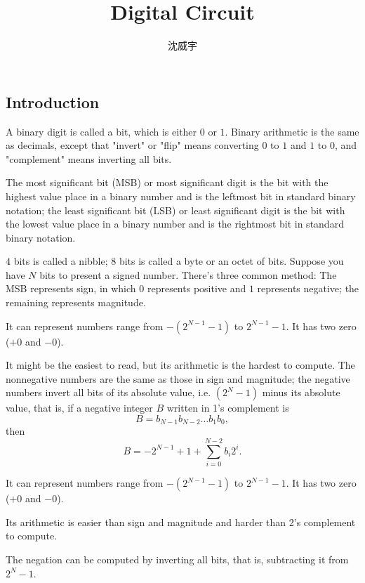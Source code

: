 \documentclass[a4paper,12pt]{report}
\begin{document}
\title{Digital Circuit}
\author{沈威宇}
\date{\temtoday}
\titletocdoc
{}
\subsection{Introduction}
A binary digit is called a bit, which is either $0$ or $1$. Binary arithmetic is the same as decimals, except that "invert" or "flip" means converting $0$ to $1$ and $1$ to $0$, and "complement" means inverting all bits.

The most significant bit (MSB) or most significant digit is the bit with the highest value place in a binary number and is the leftmost bit in standard binary notation; the least significant bit (LSB) or least significant digit is the bit with the lowest value place in a binary number and is the rightmost bit in standard binary notation.

$4$ bits is called a nibble; $8$ bits is called a byte or an octet of bits.
Suppose you have $N$ bits to present a signed number. There's three common method:
The MSB represents sign, in which $0$ represents positive and $1$ represents negative; the remaining represents magnitude. 

It can represent numbers range from $-(2^{N-1}-1)$ to $2^{N-1}-1$. It has two zero ($+0$ and $-0$).

It might be the easiest to read, but its arithmetic is the hardest to compute.
The nonnegative numbers are the same as those in sign and magnitude; the negative numbers invert all bits of its absolute value, i.e. $(2^N-1)$ minus its absolute value, that is, if a negative integer $B$ written in 1's complement is
\[B=b_{N-1}b_{N-2}\ldots b_1b_0,\]
then
\[B=-2^{N-1}+1+\sum_{i=0}^{N-2}b_i2^i.\]

It can represent numbers range from $-(2^{N-1}-1)$ to $2^{N-1}-1$. It has two zero ($+0$ and $-0$). 

Its arithmetic is easier than sign and magnitude and harder than 2's complement to compute. 

The negation can be computed by inverting all bits, that is, subtracting it from $2^N-1$.
\end{document}
